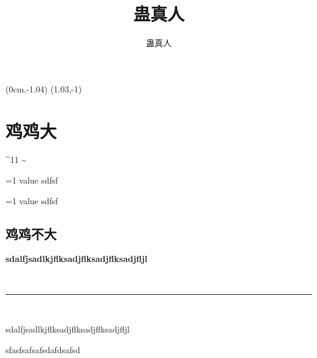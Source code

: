 \documentclass[hyperref,UTF8]{ctexrep}
\title{蛊真人}
\author{蛊真人}
\newenvironment{thisBody}
	{
		\zihao{3}
	}%
	{
		\clearpage
	}%
\begin{document}
\fancyput*(0cm,-1.04\textheight){ \setlength\fboxsep{0pt} \noindent\framebox[1.03\textwidth]{ \noindent \rule{0cm}{ 1.04\textheight } } }
\fancyput*(1.03\textwidth,-1\textheight){ \setlength\fboxsep{0pt} \noindent\framebox[2cm]{ \noindent \rule{0cm}{ \textheight } } }

 
\maketitle%
 

 


\newcommand\testvvvv[1]{ \ifnum #1=1 value \fi sdfsf }


\chapter{鸡鸡大}


\female
\mars
\male

\textdegree
\textasciicircum{}11
\textasciitilde{}
\textemdash\textemdash
 \newmoon
 \rightmoon
 \fullmoon
 \leftmoon



\testvvvv{1}

\testvvvv{0}

\setcounter{secnumdepth}{-2}
\section{鸡鸡不大}
\setcounter{secnumdepth}{3}

	\begin{thisBody} 
		\textbf {sdalfjsadlkjflksadjflksadjflksadjfljl}

\noindent \, \hfill \rule[0.5ex]{0.95\linewidth}{0.5pt} \hfill \,

\noindent		\dag \hfill sdalfjsadlkjflksadjflksadjflksadjfljl \hfill \dag 

		sfasfsafsafsdafdsafsd
	\end{thisBody}
\end{document}
